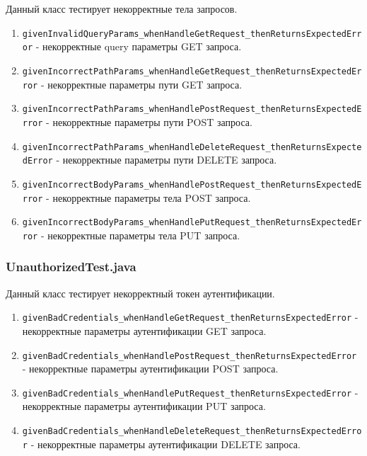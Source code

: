 \documentclass[a4paper, 14pt]{article}
\begin{document}
Данный класс тестирует некорректные тела запросов.

\begin{enumerate}
    \item \texttt{givenInvalidQueryParams\_whenHandleGetRequest\_thenReturnsExpectedError} - некорректные query параметры GET запроса.
    \item \texttt{givenIncorrectPathParams\_whenHandleGetRequest\_thenReturnsExpectedError} - некорректные параметры пути GET запроса.
    \item \texttt{givenIncorrectPathParams\_whenHandlePostRequest\_thenReturnsExpectedError} - некорректные параметры пути POST запроса.
    \item \texttt{givenIncorrectPathParams\_whenHandleDeleteRequest\_thenReturnsExpectedError} - некорректные параметры пути DELETE запроса.
    \item \texttt{givenIncorrectBodyParams\_whenHandlePostRequest\_thenReturnsExpectedError} - некорректные параметры тела POST запроса.
    \item \texttt{givenIncorrectBodyParams\_whenHandlePutRequest\_thenReturnsExpectedError} - некорректные параметры тела PUT запроса.
\end{enumerate}

\subsubsection{UnauthorizedTest.java}

Данный класс тестирует некорректный токен аутентификации.

\begin{enumerate}
    \item \texttt{givenBadCredentials\_whenHandleGetRequest\_thenReturnsExpectedError} - некорректные параметры аутентификации GET запроса.
    \item \texttt{givenBadCredentials\_whenHandlePostRequest\_thenReturnsExpectedError} - некорректные параметры аутентификации POST запроса.
    \item \texttt{givenBadCredentials\_whenHandlePutRequest\_thenReturnsExpectedError} - некорректные параметры аутентификации PUT запроса.
    \item \texttt{givenBadCredentials\_whenHandleDeleteRequest\_thenReturnsExpectedError} - некорректные параметры аутентификации DELETE запроса.
\end{enumerate}
\end{document}
